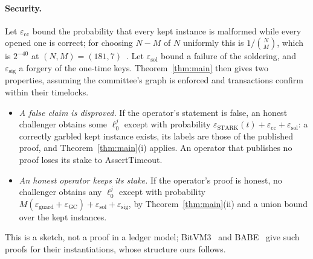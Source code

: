 \documentclass[11pt]{article}
\begin{document}
\paragraph{Security.} Let $\varepsilon_{\mathrm{cc}}$ bound the probability
that every kept instance is malformed while every opened one is correct; for
choosing $N-M$ of $N$ uniformly this is $1/\binom{N}{M}$, which is $2^{-40}$ at
$(N,M)=(181,7)$~\cite{babe2026}. Let $\varepsilon_{\mathrm{sol}}$ bound a failure of
the soldering, and $\varepsilon_{\mathrm{sig}}$ a forgery of the one-time keys.
Theorem~\ref{thm:main} then gives two properties, assuming the
committee's graph is enforced and transactions confirm within their timelocks.
\begin{itemize}
  \item \emph{A false claim is disproved.} If the operator's statement is false, an
    honest challenger obtains some $\ell^j_0$ except with probability
    $\varepsilon_{\mathrm{STARK}}(t)+\varepsilon_{\mathrm{cc}}+\varepsilon_{\mathrm{sol}}$:
    a correctly garbled kept instance exists, its labels are those of the published
    proof, and Theorem~\ref{thm:main}(i) applies. An operator that publishes no
    proof loses its stake to AssertTimeout.
  \item \emph{An honest operator keeps its stake.} If the operator's proof is
    honest, no challenger obtains any $\ell^j_0$ except with probability
    $M(\varepsilon_{\mathrm{guard}}+\varepsilon_{\mathrm{GC}})+\varepsilon_{\mathrm{sol}}+\varepsilon_{\mathrm{sig}}$,
    by Theorem~\ref{thm:main}(ii) and a union bound over the kept instances.
\end{itemize}
This is a sketch, not a proof in a ledger model; BitVM3~\cite{bitvm3paper} and
BABE~\cite{babe2026} give such proofs for their instantiations, whose structure
ours follows.
\end{document}
